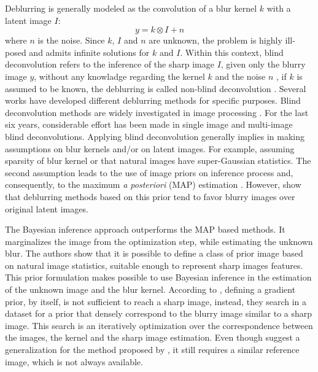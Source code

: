 \documentclass[conference]{IEEEtran}
\begin{document}
Deblurring is generally modeled as the convolution of a blur kernel $k$
with a latent image $I$: 
\begin{equation}
 y = k \otimes I + n
 \label{eq:deblurr}
\end{equation}
where $n$ is the noise. Since $k$, $I$ and $n$ are unknown, the problem 
is highly ill-posed and admits infinite solutions for $k$ and $I$.
Within this context, blind deconvolution refers to the inference of the
sharp image $I$, given only the blurry image $y$, without any knowladge
regarding the kernel $k$ and the noise $n$ \cite{Zhang2013}, if $k$ is assumed to be known,
the deblurring is called non-blind deconvolution \cite{Wang2009}. 
Several works have developed different deblurring methods for specific purposes.
Blind deconvolution methods are widely investigated in image processing \cite{Bishop2007}.
For the last six years, considerable effort has been made in single image
\cite{Babacan2012,Krishnan2015,Levin2011,Zhang2011} and multi-image \cite{sroubek2012,Zhu2012} blind deconvolutions. 
Applying blind deconvolution generally implies in making assumptions on
blur kernels and/or on latent images. For example, assuming sparsity of blur kernel
or that natural images have super-Gaussian statistics. The second assumption
leads to the use of image priors on inference process and, consequently, to the maximum \textit{a posteriori}
(MAP) estimation \cite{Babacan2012}. However, \cite{Levin} show that deblurring methods
based on this prior tend to favor blurry images over original latent images.

The Bayesian inference approach \cite{Levin} outperforms the MAP based methods. It marginalizes
the image from the optimization step, while estimating the unknown blur.
The authors show that it is possible to define a class of prior image
based on natural image statistics, suitable enough to represent sharp images features.
This prior formulation makes possible to use Bayesian inference in the estimation of the
unknown image and the blur kernel. According to \cite{Hacohen13}, defining a gradient
prior, by itself, is not sufficient to reach a sharp image, instead,
they search in a dataset for a prior that densely correspond to
the blurry image similar to a sharp image. This search is an
iteratively optimization over the correspondence between the images, the kernel and
the sharp image estimation. Even though \cite{Pan2014} suggest a generalization
for the method proposed by \cite{Hacohen13}, it still requires a similar reference image,
which is not always available.
\end{document}
